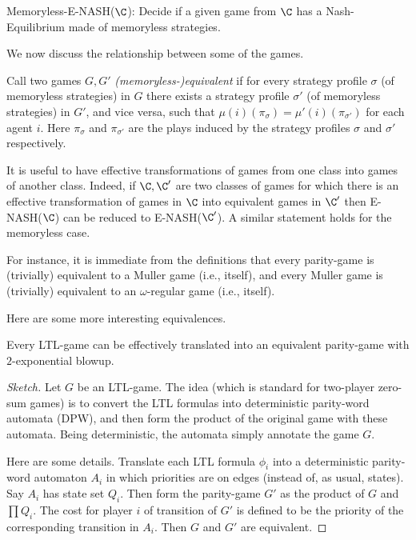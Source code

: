 \begin{definition}
 Memoryless-E-NASH($\C$): Decide if a given game from $\C$ has a Nash-Equilibrium made of memoryless strategies.
\end{definition}


We now discuss the relationship between some of the games.

\begin{definition}
Call two games $G,G'$ \emph{(memoryless-)equivalent} 
if for every strategy profile $\sigma$ (of memoryless strategies) in $G$ there exists a strategy profile 
$\sigma'$ (of memoryless strategies) in $G'$, and vice versa, such that $\mu(i)(\pi_\sigma) = \mu'(i)(\pi_{\sigma'})$ for each agent $i$. Here $\pi_\sigma$ and $\pi_{\sigma'}$
are the plays induced by the strategy profiles $\sigma$ and $\sigma'$ respectively.
\end{definition}

It is useful to have effective transformations of games from one class into games of another class. Indeed, if $\C,\C'$ are two classes of games for which 
there is an effective transformation of games in $\C$ into equivalent games in $\C'$ then E-NASH($\C$) can be reduced to E-NASH($\C'$). A similar statement holds for the memoryless case.

For instance, it is immediate from the definitions that every parity-game is (trivially) equivalent to a Muller game (i.e., itself), 
and every Muller game is (trivially) equivalent to an $\omega$-regular game (i.e., itself). 

Here are some more interesting equivalences. 

\begin{theorem}\label{thm:LTL to parity}
Every LTL-game can be effectively translated into an equivalent parity-game with $2$-exponential blowup. 
\end{theorem}

\begin{proof}[Sketch]
Let $G$ be an LTL-game.
The idea (which is standard for two-player zero-sum games) 
is to convert the LTL formulas into deterministic parity-word automata (DPW), and then form the product of the original game with these automata. 
Being deterministic, the automata
simply annotate the game $G$. 

Here are some details. Translate each LTL formula $\phi_i$ into a deterministic parity-word automaton $A_i$ in which priorities are on edges 
(instead of, as usual, states). Say $A_i$ has state set $Q_i$. 
Then form the parity-game $G'$ as the product of $G$ and $\prod Q_i$. The cost for player $i$ of transition of $G'$ is defined to be the priority of the corresponding 
transition in $A_i$. Then $G$ and $G'$ are equivalent.
\end{proof}


